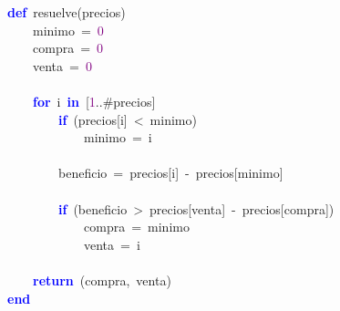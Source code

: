\noindent
\mbox{}\textbf{\textcolor{Blue}{def}}\ resuelve\textcolor{BrickRed}{(}precios\textcolor{BrickRed}{)} \\
\mbox{}\ \ \ \ minimo\ \textcolor{BrickRed}{=}\ \textcolor{Purple}{0} \\
\mbox{}\ \ \ \ compra\ \textcolor{BrickRed}{=}\ \textcolor{Purple}{0} \\
\mbox{}\ \ \ \ venta\ \textcolor{BrickRed}{=}\ \textcolor{Purple}{0} \\
\mbox{} \\
\mbox{}\ \ \ \ \textbf{\textcolor{Blue}{for}}\ i\ \textbf{\textcolor{Blue}{in}}\ \textcolor{BrickRed}{[}\textcolor{Purple}{1}\textcolor{BrickRed}{..}\#precios\textcolor{BrickRed}{]} \\
\mbox{}\ \ \ \ \ \ \ \ \textbf{\textcolor{Blue}{if}}\ \textcolor{BrickRed}{(}precios\textcolor{BrickRed}{[}i\textcolor{BrickRed}{]}\ \textcolor{BrickRed}{\textless{}}\ minimo\textcolor{BrickRed}{)} \\
\mbox{}\ \ \ \ \ \ \ \ \ \ \ \ minimo\ \textcolor{BrickRed}{=}\ i \\
\mbox{} \\
\mbox{}\ \ \ \ \ \ \ \ beneficio\ \textcolor{BrickRed}{=}\ precios\textcolor{BrickRed}{[}i\textcolor{BrickRed}{]}\ \textcolor{BrickRed}{-}\ precios\textcolor{BrickRed}{[}minimo\textcolor{BrickRed}{]} \\
\mbox{} \\
\mbox{}\ \ \ \ \ \ \ \ \textbf{\textcolor{Blue}{if}}\ \textcolor{BrickRed}{(}beneficio\ \textcolor{BrickRed}{\textgreater{}}\ precios\textcolor{BrickRed}{[}venta\textcolor{BrickRed}{]}\ \textcolor{BrickRed}{-}\ precios\textcolor{BrickRed}{[}compra\textcolor{BrickRed}{])} \\
\mbox{}\ \ \ \ \ \ \ \ \ \ \ \ compra\ \textcolor{BrickRed}{=}\ minimo \\
\mbox{}\ \ \ \ \ \ \ \ \ \ \ \ venta\ \textcolor{BrickRed}{=}\ i \\
\mbox{} \\
\mbox{}\ \ \ \ \textbf{\textcolor{Blue}{return}}\ \textcolor{BrickRed}{(}compra\textcolor{BrickRed}{,}\ venta\textcolor{BrickRed}{)} \\
\mbox{}\textbf{\textcolor{Blue}{end}} \\
\mbox{}
